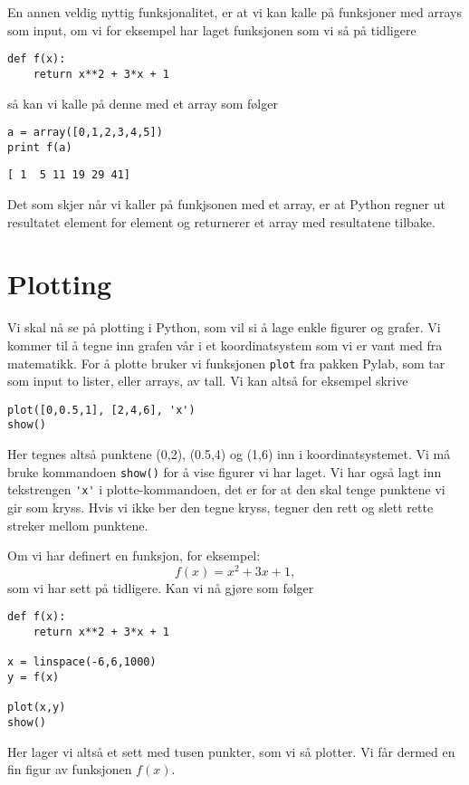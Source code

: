 \documentclass[a4paper, 11pt, notitlepage]{article}
\begin{document}
En annen veldig nyttig funksjonalitet, er at vi kan kalle på funksjoner med arrays som input, om vi for eksempel har laget funksjonen som vi så på tidligere
\begin{lstlisting}
def f(x):
    return x**2 + 3*x + 1
\end{lstlisting}
\vspace{-0.3cm}
så kan vi kalle på denne med et array som følger
\begin{lstlisting}
a = array([0,1,2,3,4,5])
print f(a)
\end{lstlisting}
\vspace{-0.3cm}
\begin{lstlisting}
[ 1  5 11 19 29 41]
\end{lstlisting}
\vspace{-0.3cm}
Det som skjer når vi kaller på funkjsonen med et array, er at Python regner ut resultatet element for element og returnerer et array med resultatene tilbake.

\section{Plotting}
Vi skal nå se på plotting i Python, som vil si å lage enkle figurer og grafer. Vi kommer til å tegne inn grafen vår i et koordinatsystem som vi er vant med fra matematikk. For å plotte bruker vi funksjonen \verb+plot+ fra pakken Pylab, som tar som input to lister, eller arrays, av tall. Vi kan altså for eksempel skrive
\begin{lstlisting}
plot([0,0.5,1], [2,4,6], 'x')
show()
\end{lstlisting}
\vspace{-0.3cm}
Her tegnes altså punktene (0,2), (0.5,4) og (1,6) inn i koordinatsystemet.
Vi må bruke kommandoen \verb+show()+ for å vise figurer vi har laget. Vi har også lagt inn tekstrengen \verb+'x'+ i plotte-kommandoen, det er for at den skal tenge punktene vi gir som kryss. Hvis vi ikke ber den tegne kryss, tegner den rett og slett rette streker mellom punktene.

Om vi har definert en funksjon, for eksempel:
$$f(x) = x^2 + 3x + 1,$$
som vi har sett på tidligere. Kan vi nå gjøre som følger
\begin{lstlisting}
def f(x):
    return x**2 + 3*x + 1

x = linspace(-6,6,1000)
y = f(x)

plot(x,y)
show()
\end{lstlisting}
\vspace{-0.3cm}
Her lager vi altså et sett med tusen punkter, som vi så plotter. Vi får dermed en fin figur av funksjonen $f(x)$. 
\end{document}
